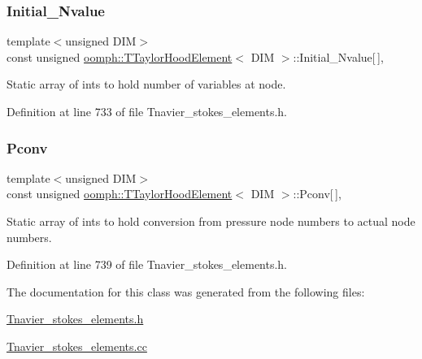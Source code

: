 \subsubsection{\texorpdfstring{Initial\+\_\+\+Nvalue}{Initial\_Nvalue}}
{\footnotesize\ttfamily template$<$unsigned D\+IM$>$ \\
const unsigned \hyperlink{classoomph_1_1TTaylorHoodElement}{oomph\+::\+T\+Taylor\+Hood\+Element}$<$ D\+IM $>$\+::Initial\+\_\+\+Nvalue\mbox{[}$\,$\mbox{]}\hspace{0.3cm}{\ttfamily [static]}, {\ttfamily [private]}}



Static array of ints to hold number of variables at node. 



Definition at line 733 of file Tnavier\+\_\+stokes\+\_\+elements.\+h.

\mbox{\label{classoomph_1_1TTaylorHoodElement_ae03a113811196f41d3d3a4b5fd6d60c9}} 
\subsubsection{\texorpdfstring{Pconv}{Pconv}}
{\footnotesize\ttfamily template$<$unsigned D\+IM$>$ \\
const unsigned \hyperlink{classoomph_1_1TTaylorHoodElement}{oomph\+::\+T\+Taylor\+Hood\+Element}$<$ D\+IM $>$\+::Pconv\mbox{[}$\,$\mbox{]}\hspace{0.3cm}{\ttfamily [static]}, {\ttfamily [protected]}}



Static array of ints to hold conversion from pressure node numbers to actual node numbers. 



Definition at line 739 of file Tnavier\+\_\+stokes\+\_\+elements.\+h.



The documentation for this class was generated from the following files\+:\begin{DoxyCompactItemize}
\item 
\hyperlink{Tnavier__stokes__elements_8h}{Tnavier\+\_\+stokes\+\_\+elements.\+h}\item 
\hyperlink{Tnavier__stokes__elements_8cc}{Tnavier\+\_\+stokes\+\_\+elements.\+cc}\end{DoxyCompactItemize}
